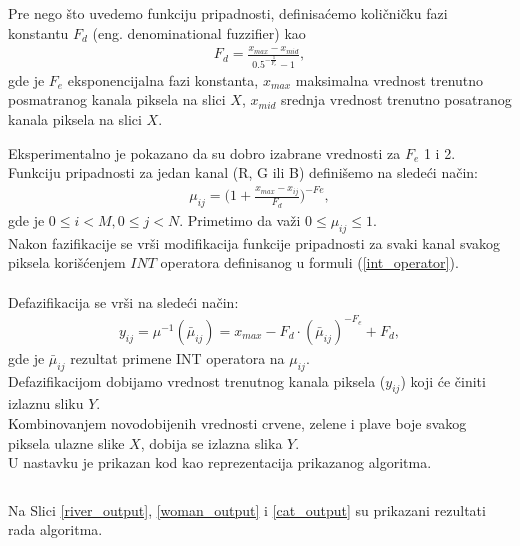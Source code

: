 \documentclass[12pt,a4paper]{article}
\theoremstyle{definition}
\theoremstyle{remark}
\theoremstyle{plain}
\begin{document}
Pre nego \v sto uvedemo funkciju pripadnosti, definisa\' cemo koli\v cni\v cku fazi konstantu $F_{d}$ (eng. denominational fuzzifier) kao
\begin{align*}
  F_{d} = \frac{x_{max} - x_{mid}}{0.5^{-\frac{1}{F_{e}}} - 1},
\end{align*}
gde je $F_{e}$ eksponencijalna fazi konstanta, $x_{max}$ maksimalna vrednost trenutno posmatranog kanala piksela na slici $X$, $x_{mid}$ srednja vrednost trenutno posatranog kanala piksela na slici $X$.

Eksperimentalno je pokazano da su dobro izabrane vrednosti za $F_e$ 1 i 2.\\

Funkciju pripadnosti za jedan kanal (R, G ili B) defini\v semo na slede\' ci na\v cin:
\begin{align*}
  \mu_{ij} = \Bigg( 1 + \frac{x_{max} - x_{ij}}{F_d}\Bigg)^{-Fe},
\end{align*}
gde je $0\leq i < M, 0\leq j < N$. Primetimo da va\v zi $0\leq \mu_{ij} \leq 1$.\\

Nakon fazifikacije se vr\v si modifikacija funkcije pripadnosti za svaki kanal svakog piksela kori\v s\' cenjem $INT$ operatora definisanog u formuli (\ref{int_operator}).\\
\\
Defazifikacija se vr\v si na slede\' ci na\v cin:\\
\begin{align*}
  y_{ij} = \mu^{-1}(\bar\mu_{ij})= x_{max} - F_d \cdot (\bar\mu_{ij})^{-F_e} + F_d,
\end{align*}
gde je $\bar\mu_{ij}$ rezultat primene INT operatora n\mbox a $\mu_{ij}$. \\

Defazifikacijom dobijamo vrednost trenutnog kanala piksela ($y_{ij}$) koji \' ce \v ciniti izlaznu sliku $Y$.\\

Kombinovanjem novodobijenih vrednosti crvene, zelene i plave boje svakog piksela ulazne slike $X$, dobija se izlazna slika $Y$. \\

U nastavku je prikazan kod kao reprezentacija prikazanog algoritma. \\

\inputminted[tabsize=2,breaklines]{cpp}{codes/latex/fuzzy_color_latex.cpp}

Na Slici \ref{river_output}, \ref{woman_output} i \ref{cat_output} su prikazani rezultati rada algoritma.
\end{document}
